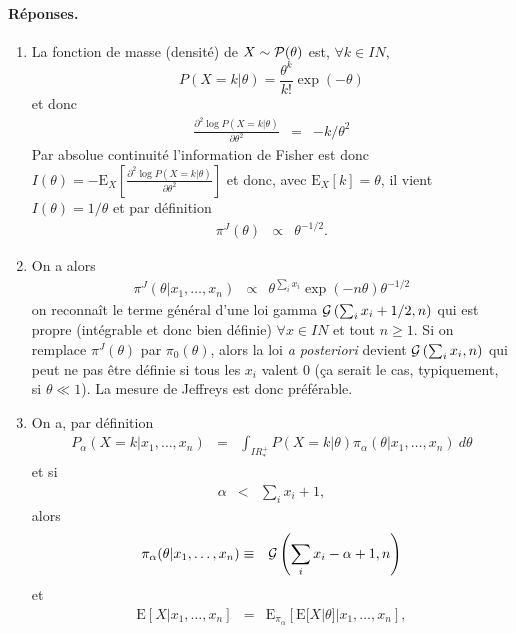 \documentclass[10pt]{article}
\newcommand{\R}{I\!\!R}
\newcommand{\N}{I\!\!N}
\newcommand{\E}{\mbox{E}}
\newcommand{\1}{\mathbbm{1}}
\begin{document}
\paragraph{\bf Réponses.}
\begin{enumerate}
\item La fonction de masse (densité) de $X\sim {\cal{P}}(\theta)$ est, $\forall k\in\N$, 
$$
P(X=k|\theta) = \frac{\theta^k}{k!}\exp(-\theta) 
$$
et donc
\begin{eqnarray*}
\frac{\partial^2 \log P(X=k|\theta)}{\partial \theta^2} &= & -k/\theta^2
\end{eqnarray*}
Par absolue continuité l'information de Fisher est donc $I(\theta)=-\E_X\left[\frac{\partial^2 \log P(X=k|\theta)}{\partial \theta^2}\right]$ et donc, avec $\E_X[k]=\theta$, il vient  $I(\theta)=1/\theta$ et par définition
\begin{eqnarray*}
\pi^J(\theta) & \propto & \theta^{-1/2}.
\end{eqnarray*}
\item On a alors
\begin{eqnarray*}
\pi^J(\theta|x_1,\ldots,x_n) & \propto & \theta^{\sum_i x_i} \exp\left(-n\theta\right) \theta^{-1/2}
\end{eqnarray*}
on reconnaît le terme général d'une loi gamma ${\cal{G}}\left(\sum_i x_i+1/2,n\right)$ qui est propre (intégrable et donc bien définie) $\forall x\in\N$ et tout $n\geq 1$. Si on remplace $\pi^J(\theta)$ par $\pi_0(\theta)$, alors la loi {\it a posteriori} devient ${\cal{G}}\left(\sum_i x_i,n\right)$ qui peut ne pas être définie si tous les $x_i$ valent 0 (\c ca serait le cas, typiquement, si $\theta\ll 1$). La mesure de Jeffreys est donc préférable.
\item On a, par définition
\begin{eqnarray}
P_{\alpha}(X=k|x_1,\ldots,x_n) & = & \int_{\R^+_*} P(X=k|\theta)\pi_{\alpha}(\theta|x_1,\ldots,x_n)\ d\theta \label{eq1}
\end{eqnarray}
et si 
\begin{eqnarray}
\alpha & < & \sum_i x_i+1, \label{cond1}
\end{eqnarray}
alors
\begin{eqnarray}
\pi_{\alpha}(\theta|x_1,\ldots,x_n) & \equiv & {\cal{G}}\left(\sum_i x_i-\alpha+1,n\right) \label{eq2}
\end{eqnarray}
et 
\begin{eqnarray*}
\E[X|x_1,\ldots,x_n] &= & \E_{\pi_{\alpha}}\left[\E[X|\theta] | x_1,\ldots,x_n\right], \\

\end{eqnarray*}
\end{enumerate}
\end{document}
